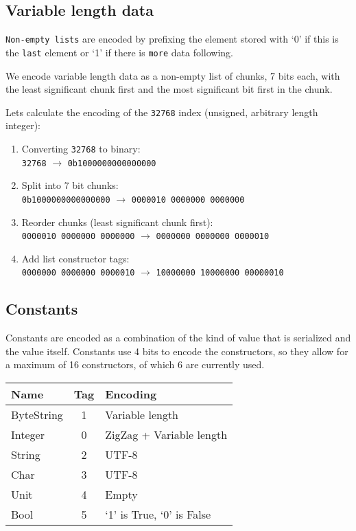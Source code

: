 \documentclass[a4paper]{article}
\newcommand\sep{4pt}
\newcommand{\Strut}{\rule[-2mm]{0mm}{6mm}}
\begin{document}
\begin{appendices}
\subsection{Variable length data}

\texttt{Non-empty lists} are encoded by prefixing the element stored with `0'
if this is the \texttt{last} element or `1' if there is \texttt{more} data following.

\noindent We encode variable length data as a non-empty list of chunks, 7 bits each,
with the least significant chunk first and the most significant bit first in the chunk.

\medskip
\noindent Lets calculate the encoding of the \texttt{32768} index (unsigned, arbitrary
length integer):
\begin{enumerate}
  \item Converting \texttt{32768} to binary: \\
    \verb|32768| $\rightarrow$ \verb|0b1000000000000000|
  \item Split into 7 bit chunks: \\
    \verb|0b1000000000000000| $\rightarrow$ \verb|0000010 0000000 0000000|
  \item Reorder chunks (least significant chunk first): \\
    \verb|0000010 0000000 0000000| $\rightarrow$ \verb|0000000 0000000 0000010|
  \item Add list constructor tags: \\
    \verb|0000000 0000000 0000010| $\rightarrow$ \verb|10000000 10000000 00000010|
\end{enumerate}

\subsection{Constants}

Constants are encoded as a combination of the kind of value that is serialized and the
value itself. Constants use 4 bits to encode the constructors, so they allow for a
maximum of 16 constructors, of which 6 are currently used.

\vspace{1cm}

\begin{minipage}{\linewidth}
\centering
\begin{tabular}{|l|c|l|}
  \hline
  \Strut
  \textrm{Name} & \textrm{Tag} & \textrm{Encoding} \\
  \hline
  ByteString & 1 & Variable length \rule{0mm}{4mm} \\[\sep]
  Integer & 0 & ZigZag + Variable length \\[\sep]
  String & 2 & UTF-8 \\[\sep]
  Char & 3 & UTF-8 \\[\sep]
  Unit & 4 & Empty \\[\sep]
  Bool & 5 & `1' is True, `0' is False \\[\sep]
  \hline
\end{tabular}
\label{fig:serialisation-constants}
\end{minipage}


\end{appendices}
\end{document}
